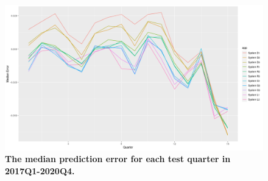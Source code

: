 \begin{figure}[ht]
\begin{center}
\includegraphics[scale=0.4]{./images/median_error_16windows}
\caption{{\bf The median prediction error for each test quarter in 2017Q1-2020Q4.}\setlength{\baselineskip}{1.25em}}
\label{fig_errors_median_error}
\end{center}
\end{figure}